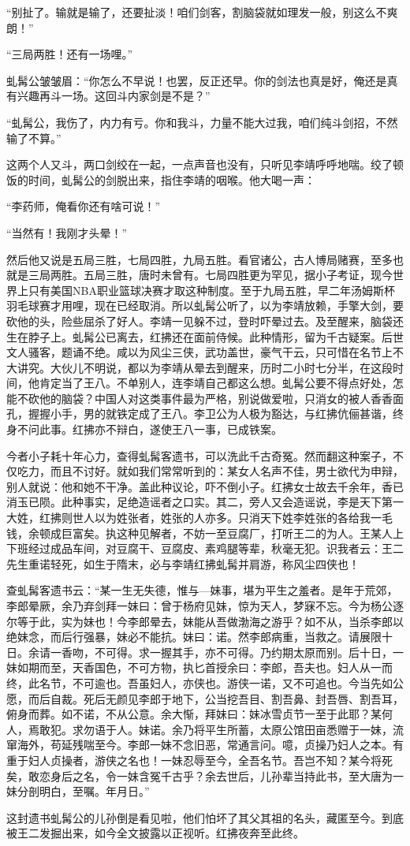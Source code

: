 “别扯了。输就是输了，还要扯淡！咱们剑客，割脑袋就如理发一般，别这么不爽朗！”

“三局两胜！还有一场哩。”

虬髯公皱皱眉：“你怎么不早说！也罢，反正还早。你的剑法也真是好，俺还是真有兴趣再斗一场。这回斗内家剑是不是？”

“虬髯公，我伤了，内力有亏。你和我斗，力量不能大过我，咱们纯斗剑招，不然输了不算。”

这两个人又斗，两口剑绞在一起，一点声音也没有，只听见李靖呼呼地喘。绞了顿饭的时间，虬髯公的剑脱出来，指住李靖的咽喉。他大喝一声：

“李药师，俺看你还有啥可说！”

“当然有！我刚才头晕！”

然后他又说是五局三胜，七局四胜，九局五胜。看官诸公，古人博局赌赛，至多也就是三局两胜。五局三胜，唐时未曾有。七局四胜更为罕见，据小子考证，现今世界上只有美国NBA职业篮球决赛才取这种制度。至于九局五胜，早二年汤姆斯杯羽毛球赛才用哩，现在已经取消。所以虬髯公听了，以为李靖放赖，手擎大剑，要砍他的头，险些屈杀了好人。李靖一见躲不过，登时吓晕过去。及至醒来，脑袋还生在脖子上。虬髯公已离去，红拂还在面前侍候。此种情形，留为千古疑案。后世文人骚客，题诵不绝。咸以为风尘三侠，武功盖世，豪气干云，只可惜在名节上不大讲究。大伙儿不明说，都以为李靖从晕去到醒来，历时二小时七分半，在这段时间，他肯定当了王八。不单别人，连李靖自己都这么想。虬髯公要不得点好处，怎能不砍他的脑袋？中国人对这类事件最为严格，别说做爱啦，只消女的被人香香面孔，握握小手，男的就铁定成了王八。李卫公为人极为豁达，与红拂伉俪甚谐，终身不问此事。红拂亦不辩白，遂使王八一事，已成铁案。

今者小子耗十年心力，查得虬髯客遗书，可以洗此千古奇冤。然而翻这种案子，不仅吃力，而且不讨好。就如我们常常听到的：某女人名声不佳，男士欲代为申辩，别人就说：他和她不干净。盖此种议论，吓不倒小子。红拂女士故去千余年，香已消玉已陨。此种事实，足绝造谣者之口实。其二，旁人又会造谣说，李是天下第一大姓，红拂则世人以为姓张者，姓张的人亦多。只消天下姓李姓张的各给我一毛钱，余顿成巨富矣。执这种见解者，不妨一至豆腐厂，打听王二的为人。王某人上下班经过成品车间，对豆腐干、豆腐皮、素鸡腿等辈，秋毫无犯。识我者云：王二先生重诺轻死，如生于隋末，必与李靖红拂虬髯并肩游，称风尘四侠也！

查虬髯客遗书云：“某一生无失德，惟与—妹事，堪为平生之羞者。是年于荒郊，李郎晕厥，余乃弃剑拜一妹曰：曾于杨府见妹，惊为天人，梦寐不忘。今为杨公逐尔等于此，实为妹也！今李郎晕去，妹能从吾做渤海之游乎？如不从，当杀李郎以绝妹念，而后行强暴，妹必不能抗。妹曰：诺。然李郎病重，当救之。请展限十日。余请一香吻，不可得。求一握其手，亦不可得。乃约期太原而别。后十日，一妹如期而至，天香国色，不可方物，执匕首授余曰：李郎，吾夫也。妇人从一而终，此名节，不可逾也。吾虽妇人，亦侠也。游侠一诺，又不可追也。今当先如公愿，而后自裁。死后无颜见李郎于地下，公当挖吾目、割吾鼻、封吾唇、割吾耳，俯身而葬。如不诺，不从公意。余大惭，拜妹曰：妹冰雪贞节一至于此耶？某何人，焉敢犯。求勿语于人。妹诺。余乃将平生所蓄，太原公馆田亩悉赠于一妹，流窜海外，苟延残喘至今。李郎一妹不念旧恶，常通言问。噫，贞操乃妇人之本。有重于妇人贞操者，游侠之名也！一妹忍辱至今，全吾名节。吾岂不知？某今将死矣，敢恋身后之名，令一妹含冤千古乎？余去世后，儿孙辈当持此书，至大唐为一妹分剖明白，至嘱。年月日。”

这封遗书虬髯公的儿孙倒是看见啦，他们怕坏了其父其祖的名头，藏匿至今。到底被王二发掘出来，如今全文披露以正视听。红拂夜奔至此终。

